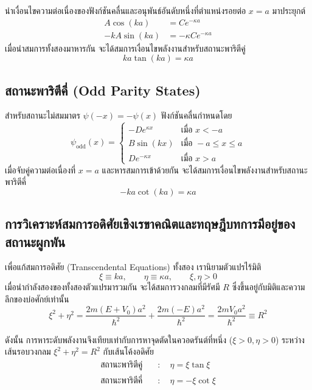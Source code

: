 นำเงื่อนไขความต่อเนื่องของฟังก์ชันคลื่นและอนุพันธ์อันดับหนึ่งที่ตำแหน่งรอยต่อ $x = a$ มาประยุกต์
\begin{align}
A \cos(ka) &= C e^{-\kappa a} \\
-k A \sin(ka) &= -\kappa C e^{-\kappa a}
\end{align}
เมื่อนำสมการทั้งสองมาหารกัน จะได้สมการเงื่อนไขพลังงานสำหรับสถานะพาริตีคู่
\begin{equation}
ka \tan(ka) = \kappa a
\end{equation}

\subsection{สถานะพาริตีคี่ (Odd Parity States)}
สำหรับสถานะไม่สมมาตร $\psi(-x) = -\psi(x)$ ฟังก์ชันคลื่นกำหนดโดย
\begin{equation}
\psi_{\text{odd}}(x) = \begin{cases}
-D e^{\kappa x} & \text{เมื่อ } x < -a \\
B \sin(kx) & \text{เมื่อ } -a \le x \le a \\
D e^{-\kappa x} & \text{เมื่อ } x > a
\end{cases}
\end{equation}
เมื่อจับคู่ความต่อเนื่องที่ $x = a$ และหารสมการเข้าด้วยกัน จะได้สมการเงื่อนไขพลังงานสำหรับสถานะพาริตีคี่
\begin{equation}
-ka \cot(ka) = \kappa a
\end{equation}

\subsection{การวิเคราะห์สมการอดิศัยเชิงเรขาคณิตและทฤษฎีบทการมีอยู่ของสถานะผูกพัน}
เพื่อแก้สมการอดิศัย (Transcendental Equations) ทั้งสอง เรานิยามตัวแปรไร้มิติ
\begin{equation}
\xi \equiv ka, \qquad \eta \equiv \kappa a, \qquad \xi, \eta > 0
\end{equation}
เมื่อนำกำลังสองของทั้งสองตัวแปรมารวมกัน จะได้สมการวงกลมที่มีรัศมี $R$ ซึ่งขึ้นอยู่กับมิติและความลึกของบ่อศักย์เท่านั้น
\begin{equation}
\xi^2 + \eta^2 = \frac{2m(E + V_0)a^2}{\hbar^2} + \frac{2m(-E)a^2}{\hbar^2} = \frac{2m V_0 a^2}{\hbar^2} \equiv R^2
\end{equation}

ดังนั้น การหาระดับพลังงานจึงเทียบเท่ากับการหาจุดตัดในควอดรันต์ที่หนึ่ง ($\xi > 0, \eta > 0$) ระหว่างเส้นรอบวงกลม $\xi^2 + \eta^2 = R^2$ กับเส้นโค้งอดิศัย
\begin{align}
\text{สถานะพาริตีคู่} \quad &\colon \quad \eta = \xi \tan\xi \label{eq_finite_even} \\
\text{สถานะพาริตีคี่} \quad &\colon \quad \eta = -\xi \cot\xi \label{eq_finite_odd}
\end{align}

